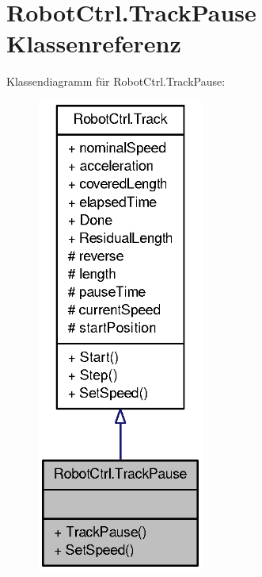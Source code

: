 \hypertarget{class_robot_ctrl_1_1_track_pause}{
\section{RobotCtrl.TrackPause Klassenreferenz}
\label{class_robot_ctrl_1_1_track_pause}
}


Klassendiagramm für RobotCtrl.TrackPause:\nopagebreak
\begin{figure}[H]
\begin{center}
\leavevmode
\includegraphics[width=156pt]{class_robot_ctrl_1_1_track_pause__inherit__graph}
\end{center}
\end{figure}


